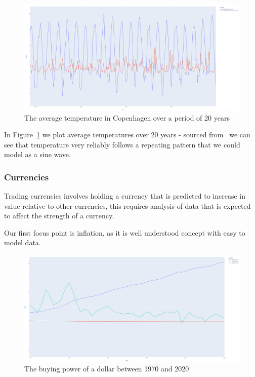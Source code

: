 \begin{figure}[H]
    \centering
    \includegraphics[width=12cm]{figures/real_data_examples/cph_average_temp}
    \caption{The average temperature in Copenhagen over a period of 20 years}
    \label{fig:real_data_climate_cph}
\end{figure}

In Figure~\ref{fig:real_data_climate_cph} we plot average temperatures over 20 years - sourced from~\cite{KaggleTemperature}
we can see that temperature very reliably follows a repeating pattern that we could model as a sine wave.

\subsubsection{Currencies}

Trading currencies involves holding a currency that is predicted to increase in value relative to other currencies,
this requires analysis of data that is expected to affect the strength of a currency.

Our first focus point is inflation, as it is well understood concept with easy to model data.

\begin{figure}[H]
    \centering
    \includegraphics[width=12cm]{figures/real_data_examples/dollar_value_statistics}
    \caption{The buying power of a dollar between 1970 and 2020}
    \label{fig:real_data_inflation}
\end{figure}

